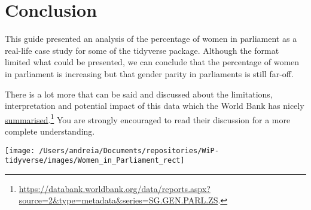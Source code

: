 \documentclass[a4paper,9pt,twocolumn,twoside,]{pinp}
\begin{document}
\hypertarget{conclusion}{%
\section{Conclusion}\label{conclusion}}

This guide presented an analysis of the percentage of women in
parliament as a real-life case study for some of the tidyverse package.
Although the format limited what could be presented, we can conclude
that the percentage of women in parliament is increasing but that gender
parity in parliaments is still far-off.

There is a lot more that can be said and discussed about the
limitations, interpretation and potential impact of this data which the
World Bank has nicely
\href{https://databank.worldbank.org/data/reports.aspx?source=2\&type=metadata\&series=SG.GEN.PARL.ZS\#}{summarised}.\footnote{\url{https://databank.worldbank.org/data/reports.aspx?source=2\&type=metadata\&series=SG.GEN.PARL.ZS}.}
You are strongly encouraged to read their discussion for a more complete
understanding.

\begin{center}\texttt{[image: /Users/andreia/Documents/repositories/WiP-tidyverse/images/Women\_in\_Parliament\_rect]} \end{center}





\end{document}
